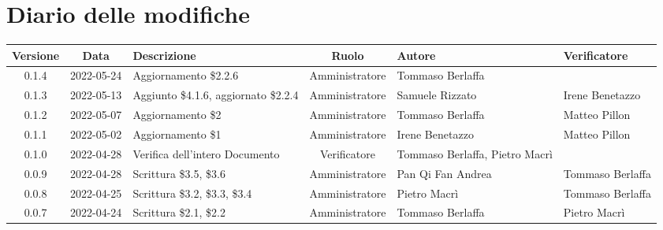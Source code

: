 \section*{Diario delle modifiche}
	\begin{center}
	\renewcommand{\arraystretch}{1.8} %
	\begin{longtable}{ |c|c|p{8em}|c|m{5em}|m{6em}| }
	\hline
	\textbf{Versione} & \textbf{Data} & \textbf{Descrizione} &  \textbf{Ruolo} &  \textbf{Autore} & \textbf{Verificatore}\\ %
	\hline %
	0.1.4 & 2022-05-24 & Aggiornamento \$2.2.6 & Amministratore & Tommaso \newline Berlaffa & \\
  \hline
  0.1.3 & 2022-05-13 & Aggiunto \$4.1.6, aggiornato \$2.2.4 & Amministratore & Samuele \newline Rizzato & Irene Benetazzo\\
  \hline
	0.1.2 & 2022-05-07 & Aggiornamento \$2 & Amministratore & Tommaso \newline Berlaffa & Matteo \newline Pillon\\
  \hline
	0.1.1 & 2022-05-02 & Aggiornamento \$1 & Amministratore & Irene \newline Benetazzo & Matteo \newline Pillon\\
	\hline
	0.1.0 & 2022-04-28 & Verifica dell'intero Documento & Verificatore & Tommaso Berlaffa, \newline Pietro Macrì & \\
	\hline
	0.0.9 & 2022-04-28 & Scrittura \newline \$3.5, \$3.6 & Amministratore & Pan Qi Fan \newline Andrea & Tommaso \newline Berlaffa\\
	\hline
	0.0.8 & 2022-04-25 & Scrittura \newline \$3.2, \$3.3, \$3.4 & Amministratore& Pietro \newline Macrì & Tommaso \newline Berlaffa\\
	\hline
	0.0.7 & 2022-04-24 & Scrittura \newline \$2.1, \$2.2 & Amministratore & Tommaso \newline Berlaffa & Pietro \newline Macrì\\

\end{longtable}
\end{center}
